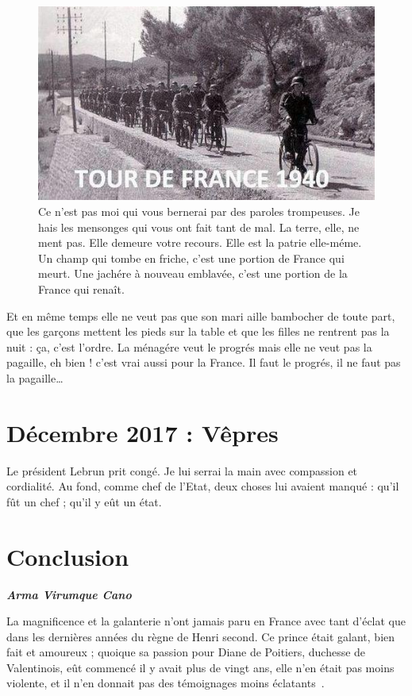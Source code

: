 \documentclass[a4paper,footinbib,final,openany,final,12pt]{book}
\begin{document}
\begin{figure}[!htb]
\begin{center}
\includegraphics[width=14cm]{Fig05}
\caption{Ce n'est pas moi qui vous bernerai par des paroles trompeuses. Je hais les mensonges qui vous ont fait tant de mal. La terre, elle, ne ment pas. Elle demeure votre recours. Elle est la patrie elle-m{\'{e}}me. Un champ qui tombe en friche, c'est une portion de France qui meurt. Une jach{\'{e}}re {\`{a}} nouveau emblav{\'{e}}e, c'est une portion de la France qui rena{\^{i}}t.}
\label{Fig5}
\end{center}
\end{figure}

Et en m{\^{e}}me temps elle ne veut pas que son mari aille bambocher de toute part, que les gar{\c{c}}ons mettent les pieds sur la table et que les filles ne rentrent pas la nuit : {\c{c}}a, c'est l'ordre. La m{\'{e}}nag{\'{e}}re veut le progr{\'{e}}s mais elle ne veut pas la pagaille, eh bien ! c'est vrai aussi pour la France. Il faut le progr{\'{e}}s, il ne faut pas la pagaille\ldots
	
		
\section{D{\'{e}}cembre 2017 : V{\^{e}}pres}

Le pr{\'{e}}sident Lebrun prit cong{\'{e}}. Je lui serrai la main avec compassion et cordialit{\'{e}}. Au fond, comme chef de l'Etat, deux choses lui avaient manqu{\'{e}} : qu'il f{\^{u}}t un chef ; qu'il y e{\^{u}}t un {\'{e}}tat.
\newpage
\section{Conclusion}
\begin{flushright}
\emph{\textbf{\small{Arma Virumque Cano}}}
\end{flushright}
  La magnificence et la galanterie n'ont jamais paru en France avec tant d'{\'{e}}clat que dans les derni{\`{e}}res ann{\'{e}}es du r{\`{e}}gne de Henri second. Ce prince {\'{e}}tait galant, bien fait et amoureux ; quoique sa passion pour Diane de Poitiers, duchesse de Valentinois, e{\^{u}}t commenc{\'{e}} il y avait plus de vingt ans, elle n'en {\'{e}}tait pas moins violente, et il n'en donnait pas des t{\'{e}}moignages moins {\'{e}}clatants~\cite{Sade}.
\end{document}

